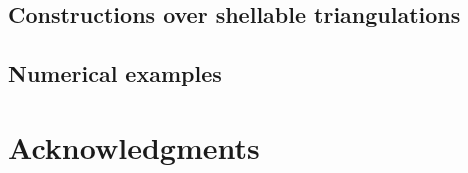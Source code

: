 \documentclass[a4paper]{article}
\begin{document}
\subsection{Constructions over shellable triangulations}

\subsection{Numerical examples}




\section*{Acknowledgments}



\end{document}
